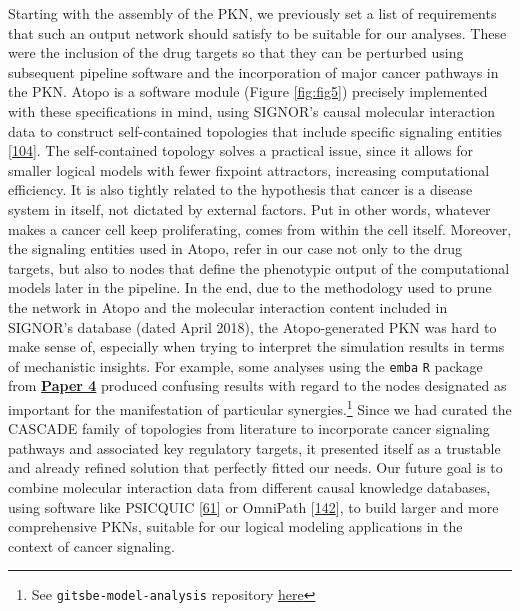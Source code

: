 \documentclass[
  12pt,
]{book}
\begin{document}
Starting with the assembly of the PKN, we previously set a list of requirements that such an output network should satisfy to be suitable for our analyses.
These were the inclusion of the drug targets so that they can be perturbed using subsequent pipeline software and the incorporation of major cancer pathways in the PKN.
Atopo is a software module (Figure \ref{fig:fig5}) precisely implemented with these specifications in mind, using SIGNOR's causal molecular interaction data to construct self-contained topologies that include specific signaling entities {[}\protect\hyperlink{ref-Flobak2016}{104}{]}.
The self-contained topology solves a practical issue, since it allows for smaller logical models with fewer fixpoint attractors, increasing computational efficiency.
It is also tightly related to the hypothesis that cancer is a disease system in itself, not dictated by external factors.
Put in other words, whatever makes a cancer cell keep proliferating, comes from within the cell itself.
Moreover, the signaling entities used in Atopo, refer in our case not only to the drug targets, but also to nodes that define the phenotypic output of the computational models later in the pipeline.
In the end, due to the methodology used to prune the network in Atopo and the molecular interaction content included in SIGNOR's database (dated April 2018), the Atopo-generated PKN was hard to make sense of, especially when trying to interpret the simulation results in terms of mechanistic insights.
For example, some analyses using the \texttt{emba} \texttt{R} package from \textbf{\protect\hyperlink{Paper4}{Paper 4}} produced confusing results with regard to the nodes designated as important for the manifestation of particular synergies.\footnote{See \texttt{gitsbe-model-analysis} repository \protect\hyperlink{misc-links}{here}}
Since we had curated the CASCADE family of topologies from literature to incorporate cancer signaling pathways and associated key regulatory targets, it presented itself as a trustable and already refined solution that perfectly fitted our needs.
Our future goal is to combine molecular interaction data from different causal knowledge databases, using software like PSICQUIC {[}\protect\hyperlink{ref-Aranda2011}{61}{]} or OmniPath {[}\protect\hyperlink{ref-Turei2016}{142}{]}, to build larger and more comprehensive PKNs, suitable for our logical modeling applications in the context of cancer signaling.
\end{document}
